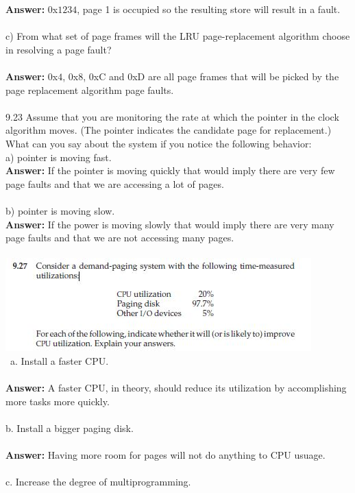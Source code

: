 \documentclass[12pt]{article}
\begin{document}
\textbf{Answer: } $0$x$1234$, page 1 is occupied so the resulting 
store will result in a fault.\\\\
c) From what set of page frames will the LRU page-replacement
algorithm choose in resolving a page fault?\\\\
\textbf{Answer: } $0$x$4$, $0$x$8$, $0$xC and $0$xD are all page 
frames that will be picked by the page replacement algorithm page faults. \\\\
9.23 Assume that you are monitoring the rate at which the pointer in the
clock algorithm moves. (The pointer indicates the candidate page for
replacement.) What can you say about the system if you notice the
following behavior:\\
a) pointer is moving fast.\\
\textbf{Answer: } If the pointer is moving quickly that would imply there 
are very few page faults and that we are accessing a lot of pages.
\\\\
b) pointer is moving slow.\\
\textbf{Answer: } If the power is moving slowly that would imply there are 
very many page faults and that we are not accessing many pages.
\\\\
\includegraphics[scale = 1]{q27.JPG}\\\
a. Install a faster CPU.\\\\
\textbf{Answer: } A faster CPU, in theory, should reduce its utilization by 
accomplishing more tasks more quickly.
\\\\
b. Install a bigger paging disk.\\\\
\textbf{Answer: } Having more room for pages will not do anything to CPU usuage.
\\\\
c. Increase the degree of multiprogramming.\\\\
\end{document}
